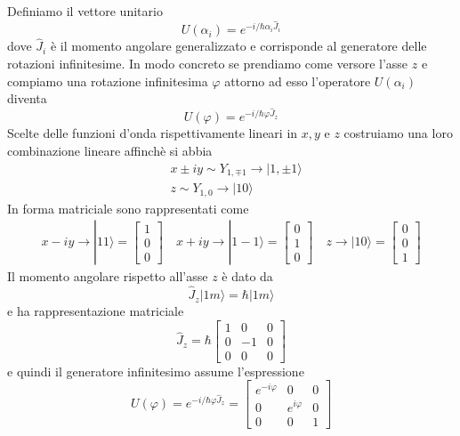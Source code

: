 Definiamo il vettore unitario 
\begin{equation*}
	U(\alpha_i) = e^{- i/\hbar \alpha_i \hat{J}_i}
\end{equation*}
dove $\hat{J}_i$ \`e il momento angolare generalizzato e corrisponde al generatore delle rotazioni infinitesime. In modo concreto se prendiamo come versore l'asse $z$ e compiamo una rotazione infinitesima $\varphi$ attorno ad esso l'operatore $U(\alpha_i)$ diventa
\begin{equation*}
	U(\varphi) = e^{- i/\hbar \varphi \hat{J}_{z}}
\end{equation*}
Scelte delle funzioni d'onda rispettivamente lineari in $x,y$ e $z$ costruiamo una loro combinazione lineare affinch\`e si abbia
\begin{align*}
	& x \pm iy \sim Y_{1,\mp 1} \to |1,\pm1 \rangle \\[0.4cm]
	& z \sim Y_{1,0} \to |10 \rangle
\end{align*}
In forma matriciale sono rappresentati come 
\begin{align*}
	x-iy  \to |11 \rangle = \left[\begin{array}{c}
		1 \\ 0 \\ 0
	\end{array}\right] \quad 	x+iy  \to |1-1 \rangle = \left[\begin{array}{c}
		0 \\ 1 \\ 0
	\end{array}\right] \quad 	z  \to |10 \rangle = \left[\begin{array}{c}
		0 \\ 0 \\ 1
	\end{array}\right]
\end{align*}
Il momento angolare rispetto all'asse $z$ \`e dato da 
\begin{equation*}
	\hat{J}_{z} |1m\rangle = \hbar|1m \rangle 
\end{equation*} e ha rappresentazione matriciale 
\begin{equation*}
	\hat{J}_{z} = \hbar \left[\begin{array}{ccc}
		1 & 0 & 0 \\
		0 & -1 & 0 \\
		0 & 0 & 0
	\end{array}\right]
\end{equation*}
e quindi il generatore infinitesimo assume l'espressione
\begin{equation*}
	U(\varphi) = e^{- i/\hbar \varphi \hat{J}_{z}} = \left[\begin{array}{ccc}
		e^{-i\varphi} & 0 & 0 \\
		0 & e^{i \varphi} & 0 \\
		0 & 0 & 1
	\end{array}\right]
\end{equation*}
